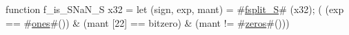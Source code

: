 function f_is_SNaN_S   x32 = {
  let (sign, exp, mant) = #\hyperref[sailRISCVzfsplitzyS]{fsplit\_S}# (x32);
  (  (exp == #\hyperref[sailRISCVzones]{ones}#())
   & (mant [22] == bitzero)
   & (mant != #\hyperref[sailRISCVzzzeros]{zeros}#()))
}
